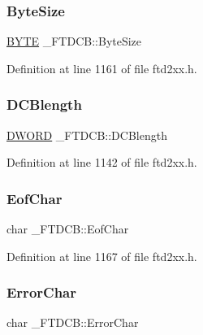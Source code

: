 \subsubsection{\texorpdfstring{Byte\+Size}{ByteSize}}
{\footnotesize\ttfamily \hyperlink{CatCaloProto40MHz_2inc_2WinTypes_8h_a4ae1dab0fb4b072a66584546209e7d58}{B\+Y\+TE} \+\_\+\+F\+T\+D\+C\+B\+::\+Byte\+Size}



Definition at line 1161 of file ftd2xx.\+h.

\mbox{\label{struct__FTDCB_a0d577b6cc351abc8313fd7eeaf7a4468}} 
\subsubsection{\texorpdfstring{D\+C\+Blength}{DCBlength}}
{\footnotesize\ttfamily \hyperlink{CatCaloProto40MHz_2inc_2WinTypes_8h_ad342ac907eb044443153a22f964bf0af}{D\+W\+O\+RD} \+\_\+\+F\+T\+D\+C\+B\+::\+D\+C\+Blength}



Definition at line 1142 of file ftd2xx.\+h.

\mbox{\label{struct__FTDCB_a6f0a84ef54dbc36123a40e05ba94aa4e}} 
\subsubsection{\texorpdfstring{Eof\+Char}{EofChar}}
{\footnotesize\ttfamily char \+\_\+\+F\+T\+D\+C\+B\+::\+Eof\+Char}



Definition at line 1167 of file ftd2xx.\+h.

\mbox{\label{struct__FTDCB_a0b8fa24da4dcdba892abd2c6cdb55707}} 
\subsubsection{\texorpdfstring{Error\+Char}{ErrorChar}}
{\footnotesize\ttfamily char \+\_\+\+F\+T\+D\+C\+B\+::\+Error\+Char}



